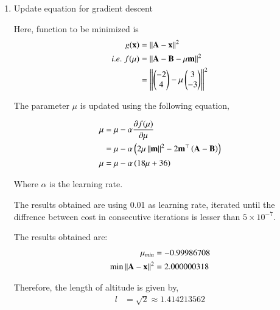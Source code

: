 \documentclass[journal,12pt,twocolumn]{IEEEtran}
\begin{document}
\begin{enumerate}
	\item Update equation for gradient descent


	Here, function to be minimized is
	\begin{align}
		g(\mathbf{x}) &= \left\lVert\mathbf{A} - \mathbf{x}\right\rVert^2\\
		i.e. \; f(\mu) &= \left\lVert\mathbf{A} - \mathbf{B} - \mu \mathbf{m}\right\rVert^2\\
		&= \left\lVert\begin{pmatrix}-2 \\ 4\end{pmatrix} - \mu \begin{pmatrix}3 \\ -3\end{pmatrix}\right\rVert^2
	\end{align}

	The parameter $\mu$ is updated using the following equation,

	\begin{align}
		\mu &= \mu - \alpha \frac{\partial f(\mu)}{\partial \mu} \\
		&= \mu - \alpha \left( 2\mu \left\lVert\mathbf{m}\right\rVert^2 - 2 \mathbf{m}^{\top}\left(\mathbf{A}-\mathbf{B}\right)\right) \\ 
		\mu &= \mu - \alpha \left(18 \mu + 36\right) 
	\end{align}

Where $\alpha$ is the learning rate.

		The results obtained are using 0.01 as learning rate, iterated until the diffrence between cost in consecutive iterations is lesser than $5 \times 10^{-7}$.

		The results obtained are:
		\begin{align}
			\mu_{min} & = -0.99986708\\
			\text{min}\left\lVert\mathbf{A} - \mathbf{x}\right\rVert^2 & = 2.000000318
		\end{align}

Therefore, the length of altitude is given by,
		\begin{align}
			l &= \sqrt{2} \approx 1.414213562
		\end{align}

\end{enumerate}
\end{document}
